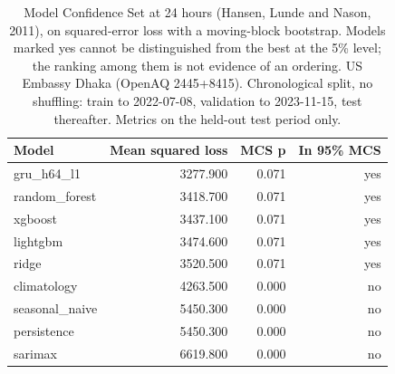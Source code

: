 \begin{table}[htbp]
\caption{Model Confidence Set at 24 hours (Hansen, Lunde and Nason, 2011), on squared-error loss with a moving-block bootstrap. Models marked yes cannot be distinguished from the best at the 5\% level; the ranking among them is not evidence of an ordering. US Embassy Dhaka (OpenAQ 2445+8415). Chronological split, no shuffling: train to 2022-07-08, validation to 2023-11-15, test thereafter. Metrics on the held-out test period only.}
\label{tab:model_confidence_set}
\begin{tabular}{lrrr}
\toprule
Model & Mean squared loss & MCS p & In 95\% MCS \\
\midrule
gru\_h64\_l1 & 3277.900 & 0.071 & yes \\
random\_forest & 3418.700 & 0.071 & yes \\
xgboost & 3437.100 & 0.071 & yes \\
lightgbm & 3474.600 & 0.071 & yes \\
ridge & 3520.500 & 0.071 & yes \\
climatology & 4263.500 & 0.000 & no \\
seasonal\_naive & 5450.300 & 0.000 & no \\
persistence & 5450.300 & 0.000 & no \\
sarimax & 6619.800 & 0.000 & no \\
\bottomrule
\end{tabular}
\end{table}
